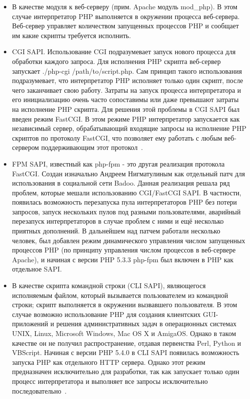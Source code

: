 \begin{itemize}
    \item   В качестве модуля к веб-серверу (прим. Apache модуль mod\_php). В этом случае интерпретатор PHP выполняется в окружении процесса веб-сервера. Веб-сервер управляет количеством запущенных процессов PHP и сообщает им какие скрипты требуется исполнить.

    \item   CGI SAPI. Использование CGI подразумевает запуск нового процесса для обработки каждого запроса. Для исполнения PHP скрипта веб-сервер запускает ./php-cgi /path/to/script.php. Сам принцип такого использования подразумевает, что интерпретатор PHP исполняет только один скрипт, после чего заканчивает свою работу. Затраты на запуск процесса интерпретатора и его инициализацию очень часто сопоставимы или даже превышают затраты на исполнение PHP скрипта. Для решения этой проблемы в CGI SAPI был введен режим FastCGI. В этом режиме PHP интерпретатор запускается как независимый сервер, обрабатывающий входящие запросы на исполнение PHP скриптов по протоколу FastCGI, что позволяет ему работать с любым веб-сервером поддерживающим этот протокол~\cite{php_documents}.

    \item   FPM SAPI, известный как php-fpm - это другая реализация протокола FastCGI. Создан изначально Андреем Нигматулиным как отдельный патч для использования в социальной сети Badoo. Данная реализация решала ряд проблем, которые мешали использованию CGI/FastCGI SAPI. В частности, появилась возможность перезапуска пула интерпретаторов PHP без потери запросов, запуск нескольких пулов под разными пользователями, аварийный перезапуск интерпретаторов в случае проблем с ними и ещё несколько приятных дополнений. В дальнейшем над патчем работали несколько человек, был добавлен режим динамического управления числом запущенных процессов PHP (по принципу управления числом процессов в веб-сервере Apache), и начиная с версии PHP 5.3.3 php-fpm был включен в PHP как отдельное SAPI.

    \item   В качестве скрипта командной строки (CLI SAPI), являющегося исполняемым файлом, который вызывается пользователем из командной строки; скрипт выполняется в окружении вызвавшего пользователя. В этом случае возможно использование PHP для создания клиентских GUI-приложений и решения административных задач в операционных системах UNIX, Linux, Microsoft Windows, Mac OS X и AmigaOS. Однако в таком качестве он не получил распространение, отдавая первенства Perl, Python и VBScript.
    Начиная с версии PHP 5.4.0 в CLI SAPI появилась возможность запуска PHP как отдельного HTTP сервера. Однако этот режим предназначен исключительно для разработки, так как запускает только один процесс интерпретатора и выполняет все запросы исключительно последовательно~\cite{php_documents}.
\end{itemize}

